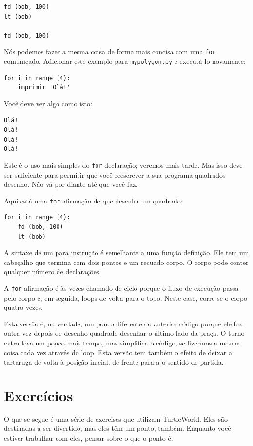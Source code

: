 \documentclass[10pt]{book}
\begin{document}
\begin{exercise}
\begin{verbatim}
fd (bob, 100)
lt (bob)

fd (bob, 100)
\end{verbatim}
%
Nós podemos fazer a mesma coisa de forma mais concisa com uma {\tt for} comunicado.
Adicionar este exemplo para {\tt mypolygon.py} e executá-lo novamente:

\begin{verbatim}
for i in range (4):
    imprimir 'Olá!'
\end{verbatim}
%
Você deve ver algo como isto:

\begin{verbatim}
Olá!
Olá!
Olá!
Olá!
\end{verbatim}
%
Este é o uso mais simples do {\tt for} declaração; veremos
mais tarde. Mas isso deve ser suficiente para permitir que você reescrever a sua
programa quadrados desenho. Não vá por diante até que você faz.

Aqui está uma {\tt for} afirmação de que desenha um quadrado:

\begin{verbatim}
for i in range (4):
    fd (bob, 100)
    lt (bob)
\end{verbatim}
%
A sintaxe de um {\tt} para instrução é semelhante a uma função
definição. Ele tem um cabeçalho que termina com dois pontos e um recuado
corpo. O corpo pode conter qualquer número de declarações.

A {\tt for} afirmação é às vezes chamado de ciclo {\bf} porque
o fluxo de execução passa pelo corpo e, em seguida, loops de volta
para o topo. Neste caso, corre-se o corpo quatro vezes.

Esta versão é, na verdade, um pouco diferente do anterior
código porque ele faz outra vez depois de desenho quadrado
desenhar o último lado da praça. O turno extra leva um pouco
mais tempo, mas simplifica o código, se fizermos a mesma coisa
cada vez através do loop. Esta versão tem também o efeito
de deixar a tartaruga de volta à posição inicial, de frente para a
o sentido de partida.

\section{Exercícios}

O que se segue é uma série de exercises que utilizam TurtleWorld. Eles
são destinadas a ser divertido, mas eles têm um ponto, também. Enquanto você estiver
trabalhar com eles, pensar sobre o que o ponto é.


\end{exercise}
\end{document}
